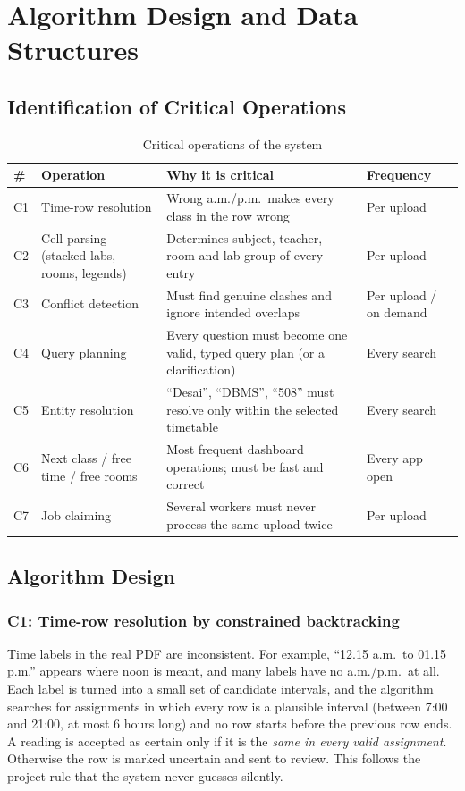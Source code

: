 \section{Algorithm Design and Data Structures}

\subsection{Identification of Critical Operations}
\begin{table}[H]
\centering
\caption{Critical operations of the system}
\label{tab:critops}
\small
\begin{tabularx}{\textwidth}{@{}p{0.8cm}p{4.2cm}Xp{2.2cm}@{}}
\toprule
\textbf{\#} & \textbf{Operation} & \textbf{Why it is critical} & \textbf{Frequency}\\
\midrule
C1 & Time-row resolution & Wrong a.m./p.m.\ makes every class in the row wrong & Per upload\\
C2 & Cell parsing (stacked labs, rooms, legends) & Determines subject, teacher, room and lab group of every entry & Per upload\\
C3 & Conflict detection & Must find genuine clashes and ignore intended overlaps & Per upload / on demand\\
C4 & Query planning & Every question must become one valid, typed query plan (or a clarification) & Every search\\
C5 & Entity resolution & ``Desai'', ``DBMS'', ``508'' must resolve only within the selected timetable & Every search\\
C6 & Next class / free time / free rooms & Most frequent dashboard operations; must be fast and correct & Every app open\\
C7 & Job claiming & Several workers must never process the same upload twice & Per upload\\
\bottomrule
\end{tabularx}
\end{table}

\subsection{Algorithm Design}
\subsubsection{C1: Time-row resolution by constrained backtracking}
Time labels in the real PDF are inconsistent. For example, ``12.15 a.m.\ to 01.15 p.m.'' appears where
noon is meant, and many labels have no a.m./p.m.\ at all. Each label is turned into a small set of
candidate intervals, and the algorithm searches for assignments in which every row is a plausible
interval (between 7:00 and 21:00, at most 6 hours long) and no row starts before the previous row
ends. A reading is accepted as certain only if it is the \emph{same in every valid assignment}.
Otherwise the row is marked uncertain and sent to review. This follows the project rule that the
system never guesses silently.

